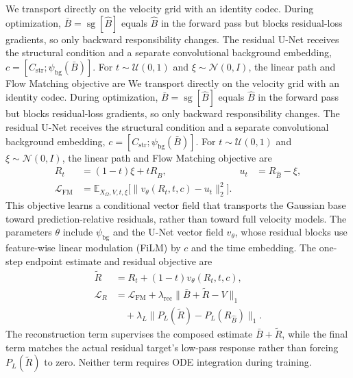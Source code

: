 \documentclass[letterpaper]{article}
\begin{document}
We transport directly on the velocity grid with an identity codec. During optimization, $\bar B=\operatorname{sg}[\hat B]$ equals $\hat B$ in the forward pass but blocks residual-loss gradients, so only backward responsibility changes. The residual U-Net receives the structural condition and a separate convolutional background embedding, $c=[C_{\mathrm{str}};\psi_{\mathrm{bg}}(\bar B)]$. For $t\sim\mathcal U(0,1)$ and $\xi\sim\mathcal N(0,I)$, the linear path and Flow Matching objective are
We transport directly on the velocity grid with an identity codec. During optimization, $\bar B=\operatorname{sg}[\hat B]$ equals $\hat B$ in the forward pass but blocks residual-loss gradients, so only backward responsibility changes. The residual U-Net receives the structural condition and a separate convolutional background embedding, $c=[C_{\mathrm{str}};\psi_{\mathrm{bg}}(\bar B)]$. For $t\sim\mathcal U(0,1)$ and $\xi\sim\mathcal N(0,I)$, the linear path and Flow Matching objective are
\begin{equation}
\begin{aligned}
R_t&=(1-t)\xi+tR_{\hat B},&
u_t&=R_{\hat B}-\xi,\\
\mathcal L_{\mathrm{FM}}
&=\mathbb E_{X_\Omega,V,t,\xi}
\bigl[\|v_\theta(R_t,t,c)-u_t\|_2^2\bigr].
\end{aligned}
\label{eq:fm-objective}
\end{equation}
This objective learns a conditional vector field that transports the Gaussian base toward prediction-relative residuals, rather than toward full velocity models.
The parameters $\theta$ include $\psi_{\mathrm{bg}}$ and the U-Net vector field $v_\theta$, whose residual blocks use feature-wise linear modulation (FiLM) \cite{perez2018film} by $c$ and the time embedding. The one-step endpoint estimate and residual objective are
\begin{equation}
\begin{aligned}
\widetilde R
&=R_t+(1-t)v_\theta(R_t,t,c),\\
\mathcal L_R
&=\mathcal L_{\mathrm{FM}}
+\lambda_{\mathrm{rec}}\|\bar B+\widetilde R-V\|_1\\
&\quad+\lambda_{L}\|P_L(\widetilde R)-P_L(R_{\hat B})\|_1.
\end{aligned}
\label{eq:residual-loss}
\end{equation}
The reconstruction term supervises the composed estimate $\bar B+\widetilde R$, while the final term matches the actual residual target's low-pass response rather than forcing $P_L(\widetilde R)$ to zero. Neither term requires ODE integration during training.
\end{document}
